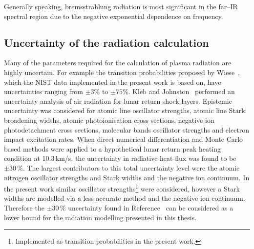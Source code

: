 Generally speaking, bremsstrahlung radiation is most significant in the far--IR spectral region due to the negative exponential dependence on frequency.

\subsection{Uncertainty of the radiation calculation}
\label{sec:rad_uncertainty}

Many of the parameters required for the calculation of plasma radiation are highly uncertain.
For example the transition probabilities proposed by Wiese~\cite{wiese_1996}, which the NIST data implemented in the present work is based on, have uncertainties ranging from $\pm3$\% to $\pm75$\%.
Kleb and Johnston~\cite{KJ2008} performed an uncertainty analysis of air radiation for lunar return shock layers.
Epistemic uncertainty was considered for atomic line oscillator strengths, atomic line Stark broadening widths, atomic photoionisation cross sections, negative ion photodetachment cross sections, molecular bands oscillator strengths and electron impact excitation rates.
When direct numerical differentiation and Monte Carlo based methods were applied to a hypothetical lunar return peak heating condition at 10.3\,km/s, the uncertainty in radiative heat-flux was found to be $\pm 30$\,\%.
The largest contributors to this total uncertainty level were the atomic nitrogen oscillator strengths and Stark widths and the negative ion continuum.
In the present work similar oscillator strengths\footnote{Implemented as transition probabilities in the present work.} were considered, however a Stark widths are modelled via a less accurate method and the negative ion continuum.
Therefore the $\pm 30$\,\% uncertainty found in Reference~\cite{KJ2008} can be considered as a lower bound for the radiation modelling presented in this thesis.


